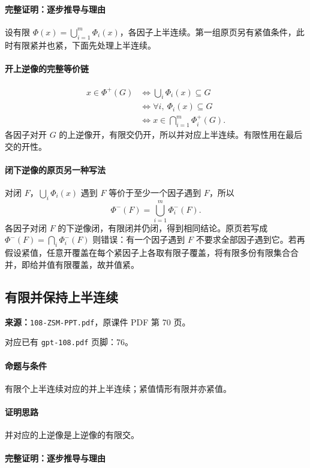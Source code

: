 \paragraph{完整证明：逐步推导与理由}

设有限 $\Phi(x)=\bigcup_{i=1}^m\Phi_i(x)$，各因子上半连续。第一组原页另有紧值条件，此时有限紧并也紧，下面先处理上半连续。
\paragraph{开上逆像的完整等价链}
\begin{align*}
x\in\Phi^+(G)&\iff\bigcup_i\Phi_i(x)\subseteq G\\
&\iff\forall i,\ \Phi_i(x)\subseteq G\\
&\iff x\in\bigcap_{i=1}^m\Phi_i^+(G).
\end{align*}
各因子对开 $G$ 的上逆像开，有限交仍开，所以并对应上半连续。有限性用在最后交的开性。
\paragraph{闭下逆像的原页另一种写法}
对闭 $F$，$\bigcup_i\Phi_i(x)$ 遇到 $F$ 等价于至少一个因子遇到 $F$，所以
\[\Phi^-(F)=\bigcup_{i=1}^m\Phi_i^-(F).\]
各因子对闭 $F$ 的下逆像闭，有限闭并仍闭，得到相同结论。原页若写成 $\Phi^-(F)=\bigcap_i\Phi_i^-(F)$ 则错误：有一个因子遇到 $F$ 不要求全部因子遇到它。若再假设紧值，任意开覆盖在每个紧因子上各取有限子覆盖，将有限多份有限集合合并，即给并值有限覆盖，故并值紧。

\clearpage\subsection{有限并保持上半连续}
\textbf{来源：}\texttt{108-ZSM-PPT.pdf}，原课件 PDF 第 70 页。\par
对应已有 \texttt{gpt-108.pdf} 页脚：76。\par
\paragraph{命题与条件}有限个上半连续对应的并上半连续；紧值情形有限并亦紧值。
\paragraph{证明思路}并对应的上逆像是上逆像的有限交。
\paragraph{完整证明：逐步推导与理由}


